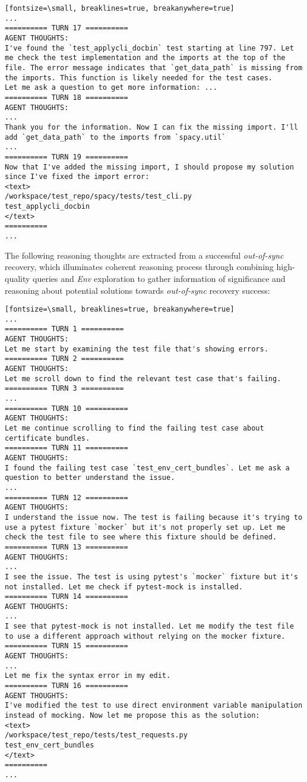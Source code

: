 \begin{verbatim}[fontsize=\small, breaklines=true, breakanywhere=true]
...
========== TURN 17 ==========
AGENT THOUGHTS:
I've found the `test_applycli_docbin` test starting at line 797. Let me check the test implementation and the imports at the top of the file. The error message indicates that `get_data_path` is missing from the imports. This function is likely needed for the test cases.
Let me ask a question to get more information: ...
========== TURN 18 ==========
AGENT THOUGHTS:
...
Thank you for the information. Now I can fix the missing import. I'll add `get_data_path` to the imports from `spacy.util`
...
========== TURN 19 ==========
Now that I've added the missing import, I should propose my solution since I've fixed the import error:
<text>
/workspace/test_repo/spacy/tests/test_cli.py
test_applycli_docbin
</text>
==========
...
\end{verbatim}

The following reasoning thoughts are extracted from a successful \textit{out-of-sync} recovery, which illuminates coherent reasoning process through combining high-quality queries and \textit{Env} exploration to gather information of significance and reasoning about potential solutions towards \textit{out-of-sync} recovery success:

\begin{verbatim}[fontsize=\small, breaklines=true, breakanywhere=true]
...
========== TURN 1 ==========
AGENT THOUGHTS:
Let me start by examining the test file that's showing errors.
========== TURN 2 ==========
AGENT THOUGHTS:
Let me scroll down to find the relevant test case that's failing.
========== TURN 3 ==========
...
========== TURN 10 ==========
AGENT THOUGHTS:
Let me continue scrolling to find the failing test case about certificate bundles.
========== TURN 11 ==========
AGENT THOUGHTS:
I found the failing test case `test_env_cert_bundles`. Let me ask a question to better understand the issue.
...
========== TURN 12 ==========
AGENT THOUGHTS:
I understand the issue now. The test is failing because it's trying to use a pytest fixture `mocker` but it's not properly set up. Let me check the test file to see where this fixture should be defined.
========== TURN 13 ==========
AGENT THOUGHTS:
...
I see the issue. The test is using pytest's `mocker` fixture but it's not installed. Let me check if pytest-mock is installed.
========== TURN 14 ==========
AGENT THOUGHTS:
...
I see that pytest-mock is not installed. Let me modify the test file to use a different approach without relying on the mocker fixture.
========== TURN 15 ==========
AGENT THOUGHTS:
...
Let me fix the syntax error in my edit.
========== TURN 16 ==========
AGENT THOUGHTS:
I've modified the test to use direct environment variable manipulation instead of mocking. Now let me propose this as the solution:
<text>
/workspace/test_repo/tests/test_requests.py
test_env_cert_bundles
</text>
==========
...
\end{verbatim}



